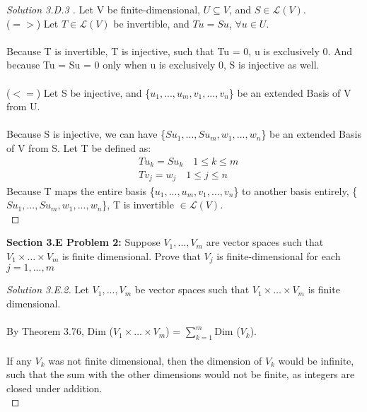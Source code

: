\documentclass[12pt]{article}
\begin{document}
	\begin{proof}[Solution 3.D.3 ]
		Let V be finite-dimensional, $U \subseteq V$, and $S \in \mathcal{L}(V)$.
		\\
		($=>$) Let $T \in \mathcal{L}(V)$ be invertible, and $Tu = Su$, $\forall u \in U$. 
		\\ \\
		Because T is invertible, T is injective, such that Tu = 0, u is exclusively 0. And because Tu = Su = 0 only when u is exclusively 0, S is injective as well.	
		\\ \\
		($<=$) Let S be injective, and \{$u_1,...,u_m,v_1,...,v_n$\} be an extended Basis of V from U. 
		\\ \\
		Because S is injective, we can have \{$Su_1,...,Su_m,w_1,...,w_n$\} be an extended Basis of V from S. Let T be defined as: 
		\begin{align*}
			&Tu_k = Su_k \quad 1 \leq k \leq m \\
			&Tv_j = w_j  \quad 1 \leq j \leq n
		\end{align*}
		Because T maps the entire basis \{$u_1,...,u_m,v_1,...,v_n$\} to another basis entirely, \{$Su_1,...,Su_m,w_1,...,w_n$\}, T is invertible $\in \mathcal{L}(V)$. \\
	\end{proof}

\vspace{\baselineskip}
\vspace{\baselineskip}

\noindent \textbf{Section 3.E Problem 2: } Suppose $V_1, ..., V_m$ are vector spaces such that $V_1 \times \dots \times V_m$ is finite dimensional. Prove that $V_j$ is finite-dimensional for each $j = 1, ..., m $

	\begin{proof}[Solution 3.E.2]
		Let  $V_1, ..., V_m$ be vector spaces such that $V_1 \times \dots \times V_m$ is finite dimensional.
		\\ \\
		By Theorem 3.76, Dim ($V_1 \times \dots \times V_m$) = $\sum_{k = 1}^{m}$Dim ($V_k$). 
		\\ \\
		If any $V_k$ was not finite dimensional, then the dimension of $V_k$ would be infinite, such that the sum with the other dimensions would not be finite, as integers are closed under addition. \\
	\end{proof}
\end{document}
